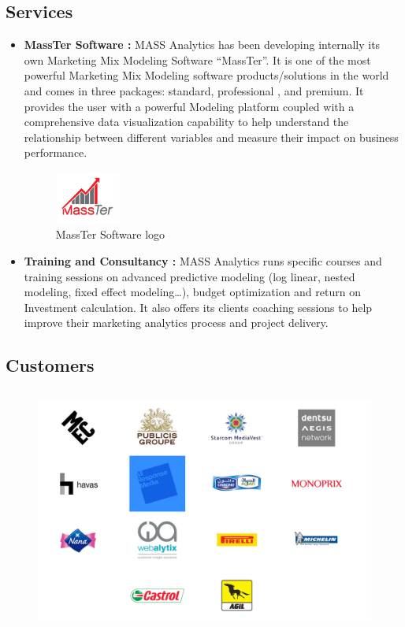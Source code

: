 	\subsection{Services}
	\begin{itemize}
		\item \textbf{MassTer Software :} MASS Analytics has been developing internally its own Marketing Mix Modeling Software ``MassTer''. It is one of the most powerful Marketing Mix Modeling software products/solutions in the world and comes in three packages: standard, professional , and premium. It provides the user with a powerful Modeling platform coupled with a comprehensive data visualization capability to help understand the relationship between different variables and measure their impact on business performance.
		\begin{figure}[h]
			\centering
			\includegraphics[width=0.2\textwidth]{massTer_logo.png}
			\caption{MassTer Software logo}
		\end{figure}
		
		\item \textbf{Training and Consultancy :} MASS Analytics runs specific courses and training sessions on advanced predictive modeling (log linear, nested modeling, fixed effect modeling…), budget optimization and return on Investment calculation. It also offers its clients coaching sessions to help improve their marketing analytics process and project delivery.
	\end{itemize}
\vspace{66mm}
	\subsection{Customers}
	
		\begin{figure}[h]
		\centering
		\includegraphics[width=14cm,height=8cm]{customers_logo.png}
		\label{customers_logo}
	\end{figure}
